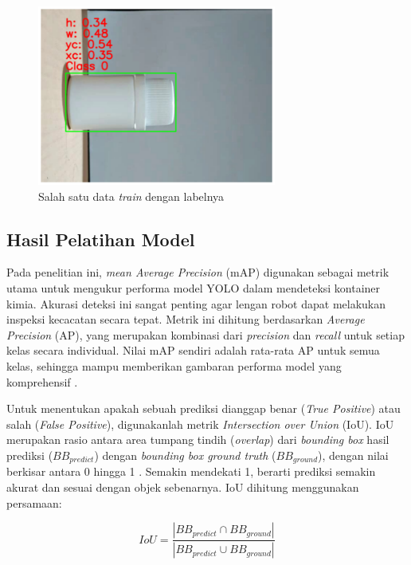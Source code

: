 \begin{figure}[H]
  \centering
  \includegraphics[width=0.7\textwidth]{gambar/anotasi.png}
  \caption{Salah satu data \textit{train} dengan labelnya}
  \label{fig:yolo-anotasi}
\end{figure}
\vspace{-1em}

\vspace{1em}

\subsection{Hasil Pelatihan Model}
Pada penelitian ini, \textit{mean Average Precision} (mAP) digunakan sebagai
metrik utama untuk mengukur performa model YOLO dalam mendeteksi
kontainer kimia. Akurasi deteksi ini sangat penting agar lengan robot
dapat melakukan inspeksi kecacatan secara tepat. Metrik ini dihitung
berdasarkan \textit{Average Precision} (AP), yang merupakan kombinasi dari
\textit{precision} dan \textit{recall} untuk setiap kelas secara
individual. Nilai mAP
sendiri adalah rata-rata AP untuk semua kelas, sehingga mampu
memberikan gambaran performa model yang komprehensif \citep{21}. \par

Untuk menentukan apakah sebuah prediksi dianggap benar (\textit{True
Positive}) atau salah (\textit{False Positive}), digunakanlah metrik
\textit{Intersection over Union} (IoU). IoU merupakan rasio antara area
tumpang tindih (\textit{overlap}) dari \textit{bounding box} hasil prediksi
($BB_{predict}$) dengan
\textit{bounding box ground truth} ($BB_{ground}$), dengan nilai berkisar antara
0 hingga 1 \citep{22}.
Semakin mendekati 1, berarti prediksi semakin akurat dan sesuai
dengan objek sebenarnya. IoU dihitung menggunakan persamaan:

\begin{equation}
  IoU = \frac{|BB_{predict} \cap
  BB_{ground}|}{|BB_{predict} \cup BB_{ground}|}
\end{equation}

